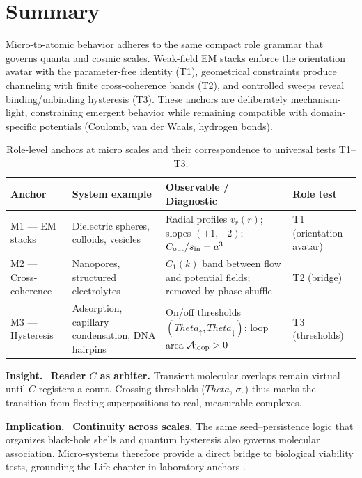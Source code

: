 \documentclass[12pt,a4paper,oneside]{scrreprt}
\def\Theta{Theta}%
\newenvironment{insight}{\par\vspace{0.5em}\noindent\textbf{Insight.}\ }{\par\vspace{0.5em}}
\newenvironment{implication}{\par\vspace{0.5em}\noindent\textbf{Implication.}\ }{\par\vspace{0.5em}}
\begin{document}
\section*{Summary}

Micro-to-atomic behavior adheres to the same compact role grammar 
that governs quanta and cosmic scales. 
Weak-field EM stacks enforce the orientation avatar with the 
parameter-free identity (T1), 
geometrical constraints produce channeling with finite cross-coherence 
bands (T2), 
and controlled sweeps reveal binding/unbinding hysteresis (T3). 
These anchors are deliberately mechanism-light, constraining 
emergent behavior while remaining compatible with domain-specific 
potentials (Coulomb, van der Waals, hydrogen bonds). 

\begin{table}[h]
\centering
\caption{Role-level anchors at micro scales and their correspondence to universal tests T1--T3.}
\begin{tabular}{p{2.8cm} p{4.2cm} p{4.2cm} p{3.5cm}}
\toprule
\textbf{Anchor} & \textbf{System example} & \textbf{Observable / Diagnostic} & \textbf{Role test} \\
\midrule
M1 — EM stacks & Dielectric spheres, colloids, vesicles & Radial profiles $v_r(r)$; slopes $(+1,-2)$; $C_{\rm out}/s_{\rm in}=a^3$ & T1 (orientation avatar) \\
\addlinespace
M2 — Cross-coherence & Nanopores, structured electrolytes & $C_1(k)$ band between flow and potential fields; removed by phase-shuffle & T2 (bridge) \\
\addlinespace
M3 — Hysteresis & Adsorption, capillary condensation, DNA hairpins & On/off thresholds $(\Theta_\uparrow,\Theta_\downarrow)$; loop area $\mathcal A_{\rm loop}>0$ & T3 (thresholds) \\
\bottomrule
\end{tabular}
\end{table}

\begin{insight}
\textbf{Reader $C$ as arbiter.} 
Transient molecular overlaps remain virtual until $C$ registers 
a count. 
Crossing thresholds ($\Theta$, $\sigma_c$) thus marks the transition 
from fleeting superpositions to real, measurable complexes. 
\end{insight}

\begin{implication}
\textbf{Continuity across scales.} 
The same seed--persistence logic that organizes black-hole shells 
and quantum hysteresis also governs molecular association. 
Micro-systems therefore provide a direct bridge to biological 
viability tests, grounding the Life chapter in laboratory anchors 
\citep{Whitesides2002SelfAssembly,Sherrill2010Noncovalent}.
\end{implication}
\end{document}
